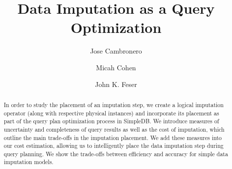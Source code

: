 \documentclass{article}
\title{Data Imputation as a Query Optimization}
\author{
  Jose Cambronero \\
  \and
  Micah Cohen
  \and
  John K. Feser}
\begin{document}
\maketitle

\begin{abstract}
In order to study the placement of an imputation step, we create a logical imputation operator (along with respective physical instances) and incorporate its placement as part of the query plan optimization process in SimpleDB.  We introduce measures of uncertainty and completeness of query results as well as the cost of imputation, which outline the main trade-offs in the imputation placement. We add these measures into our cost estimation, allowing us to intelligently place the data imputation step during query planning. We show the trade-offs between efficiency and accuracy for simple data imputation models. \end{abstract}









\end{document}
